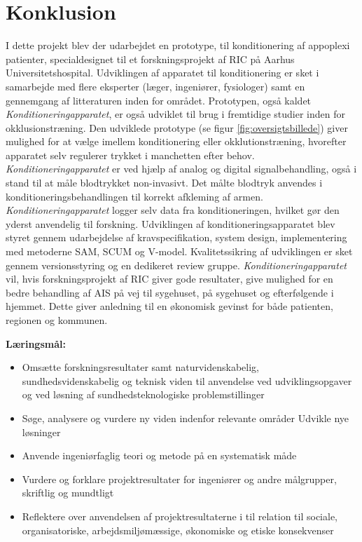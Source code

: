 \chapter{Konklusion}
I dette projekt blev der udarbejdet en prototype, til konditionering af appoplexi patienter, specialdesignet til et forskningsprojekt af RIC på Aarhus Universitetshospital. Udviklingen af apparatet til konditionering er sket i samarbejde med flere eksperter (læger, ingeniører, fysiologer) samt en gennemgang af litteraturen inden for området. Prototypen, også kaldet \textit{Konditioneringapparatet}, er også udviklet til brug i fremtidige studier inden for okklusionstræning.
Den udviklede prototype (se figur \ref{fig:oversigtsbillede}) giver mulighed for at vælge imellem konditionering eller okklutionstræning, hvorefter apparatet selv regulerer trykket i manchetten efter behov. \textit{Konditioneringapparatet} er ved hjælp af analog og digital signalbehandling, også i stand til at måle blodtrykket non-invasivt. Det målte blodtryk anvendes i konditioneringsbehandlingen til korrekt afkleming af armen. \textit{Konditioneringapparatet} logger selv data fra konditioneringen, hvilket gør den yderst anvendelig til forskning. 
Udviklingen af konditioneringsapparatet blev styret gennem udarbejdelse af kravspecifikation, system design, implementering med metoderne SAM, SCUM og V-model. Kvalitetssikring af udviklingen er sket gennem versionsstyring og en dedikeret review gruppe.
\textit{Konditioneringapparatet} vil, hvis forskningsprojekt af RIC giver gode resultater, give mulighed for en bedre behandling af AIS på vej til sygehuset, på sygehuset og efterfølgende i hjemmet. Dette giver anledning til en økonomisk gevinst for både patienten, regionen og kommunen. 


\textbf{Læringsmål:}
\begin{itemize}
	\item Omsætte forskningsresultater samt naturvidenskabelig, sundhedsvidenskabelig og teknisk viden til anvendelse ved udviklingsopgaver og ved løsning af sundhedsteknologiske problemstillinger
	\item Søge, analysere og vurdere ny viden indenfor relevante områder
	Udvikle nye løsninger
	\item Anvende ingeniørfaglig teori og metode på en systematisk måde
	\item Vurdere og forklare projektresultater for ingeniører og andre målgrupper, skriftlig og mundtligt
	
	\item Reflektere over anvendelsen af projektresultaterne i til relation til sociale, organisatoriske, arbejdsmiljømæssige, økonomiske og etiske konsekvenser
	
\end{itemize}




